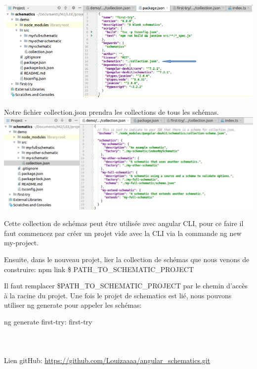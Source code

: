 \documentclass[12pt,french]{article}
\begin{document}
	\includegraphics[scale=0.65]{5.jpg} 
		
	Notre fichier collection.json prendra les collections de tous les schémas.\\
	
		\includegraphics[scale=0.5]{6.jpg}  
	
	Cette collection de schémas peut être utilisée avec angular CLI, pour ce faire il faut commencez par créer un projet vide avec la CLI via la commande ng new my-project.
	
	Ensuite, dans le nouveau projet, lier la collection de schémas que nous venons de construire:
\newline	
	npm link \$ PATH\_TO\_SCHEMATIC\_PROJECT\newline 
	
	Il faut remplacer \$PATH\_TO\_SCHEMATIC\_PROJECT par le chemin d'accès à la racine du projet. 
	Une fois le projet de schematics est lié, nous pouvons utiliser ng generate pour appeler les schémas:\newline
	
	ng generate first-try: first-try \\
		 \\
		 \\
		 \\
Lien gitHub: \url{https://github.com/Louizaaaa/angular_schematics.git}  
	
\end{document}
